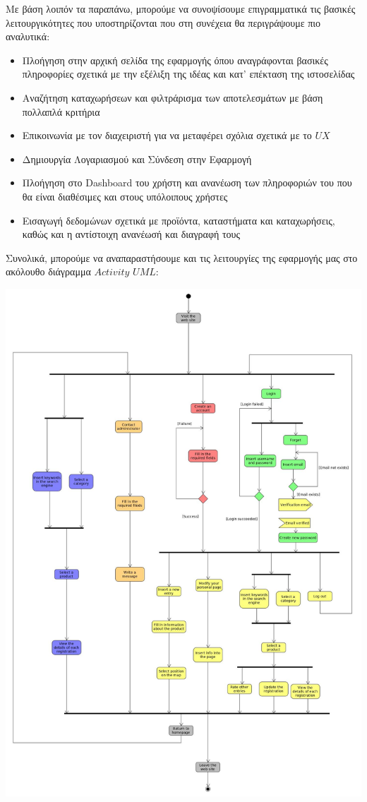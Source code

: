 \documentclass[12pt]{article}
\begin{document}
Με βάση λοιπόν τα παραπάνω, μπορούμε να συνοψίσουμε επιγραμματικά τις βασικές λειτουργικότητες που υποστηρίζονται που στη συνέχεια θα περιγράψουμε πιο αναλυτικά:

\begin{itemize}
\item Πλοήγηση στην αρχική σελίδα της εφαρμογής όπου αναγράφονται βασικές πληροφορίες σχετικά με την εξέλιξη της ιδέας και κατ' επέκταση της ιστοσελίδας
\item Αναζήτηση καταχωρήσεων και φιλτράρισμα των αποτελεσμάτων με βάση πολλαπλά κριτήρια
\item Επικοινωνία με τον διαχειριστή για να μεταφέρει σχόλια σχετικά με το $UX$
\item Δημιουργία Λογαριασμού και Σύνδεση στην Εφαρμογή
\item Πλοήγηση στο Dashboard του χρήστη και ανανέωση των πληροφοριών του που θα είναι διαθέσιμες και στους υπόλοιπους χρήστες
\item Εισαγωγή δεδομώνων σχετικά με προϊόντα, καταστήματα και καταχωρήσεις, καθώς και η αντίστοιχη ανανέωσή και διαγραφή τους
\end{itemize}

Συνολικά, μπορούμε να αναπαραστήσουμε και τις λειτουργίες της εφαρμογής μας στο ακόλουθο διάγραμμα $Activity$ $UML$:

\begin{center}
\includegraphics[scale=0.3]{UML/activityDiagram.jpg}
\end{center}
\end{document}
